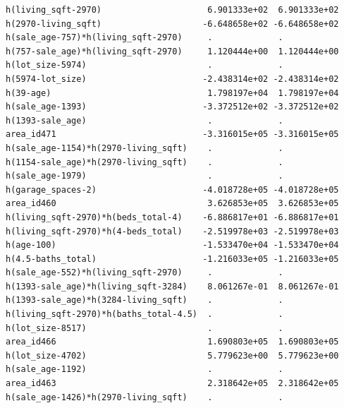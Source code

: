 \documentclass[
]{article}
\begin{document}
\begin{verbatim}
h(living_sqft-2970)                     6.901333e+02  6.901333e+02
h(2970-living_sqft)                    -6.648658e+02 -6.648658e+02
h(sale_age-757)*h(living_sqft-2970)     .             .           
h(757-sale_age)*h(living_sqft-2970)     1.120444e+00  1.120444e+00
h(lot_size-5974)                        .             .           
h(5974-lot_size)                       -2.438314e+02 -2.438314e+02
h(39-age)                               1.798197e+04  1.798197e+04
h(sale_age-1393)                       -3.372512e+02 -3.372512e+02
h(1393-sale_age)                        .             .           
area_id471                             -3.316015e+05 -3.316015e+05
h(sale_age-1154)*h(2970-living_sqft)    .             .           
h(1154-sale_age)*h(2970-living_sqft)    .             .           
h(sale_age-1979)                        .             .           
h(garage_spaces-2)                     -4.018728e+05 -4.018728e+05
area_id460                              3.626853e+05  3.626853e+05
h(living_sqft-2970)*h(beds_total-4)    -6.886817e+01 -6.886817e+01
h(living_sqft-2970)*h(4-beds_total)    -2.519978e+03 -2.519978e+03
h(age-100)                             -1.533470e+04 -1.533470e+04
h(4.5-baths_total)                     -1.216033e+05 -1.216033e+05
h(sale_age-552)*h(living_sqft-2970)     .             .           
h(1393-sale_age)*h(living_sqft-3284)    8.061267e-01  8.061267e-01
h(1393-sale_age)*h(3284-living_sqft)    .             .           
h(living_sqft-2970)*h(baths_total-4.5)  .             .           
h(lot_size-8517)                        .             .           
area_id466                              1.690803e+05  1.690803e+05
h(lot_size-4702)                        5.779623e+00  5.779623e+00
h(sale_age-1192)                        .             .           
area_id463                              2.318642e+05  2.318642e+05
h(sale_age-1426)*h(2970-living_sqft)    .             .           
                                                                  

\end{verbatim}
\end{document}
